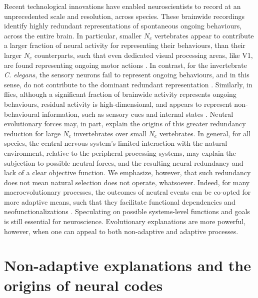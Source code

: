 \documentclass[twocolumn]{article}
\begin{document}
Recent technological innovations have enabled neuroscientists to record at an unprecedented scale and resolution, across species. These brainwide recordings identify highly redundant representations of spontaneous ongoing behaviours, across the entire brain. In particular, smaller $N_e$ vertebrates appear to contribute a larger fraction of neural activity for representing their behaviours, than their larger $N_e$ counterparts, such that even dedicated visual processing areas, like V1, are found representing ongoing motor actions \cite{stringer_harris_2019, kato_2015, aimon_2019, schaffer_2021, kaplan_zimmer_2020}. In contrast, for the invertebrate \textit{C. elegans}, the sensory neurons fail to represent ongoing behaviours, and in this sense, do not contribute to the dominant redundant representation \cite{kato_2015, kaplan_zimmer_2020}. Similarly, in flies, although a significant fraction of brainwide activity represents ongoing behaviours, residual activity is high-dimensional, and appears to represent non-behavioural information, such as sensory cues and internal states \cite{aimon_2019, schaffer_2021}. Neutral evolutionary forces may, in part, explain the origins of this greater redundancy reduction for large $N_e$ invertebrates over small $N_e$ vertebrates. In general, for all species, the central nervous system's limited interaction with the natural environment, relative to the peripheral processing systems, may explain the subjection to possible neutral forces, and the resulting neural redundancy and lack of a clear objective function. We emphasize, however, that such redundancy does not mean natural selection does not operate, whatsoever. Indeed, for many macroevolutionary processes, the outcomes of neutral events can be co-opted for more adaptive means, such that they facilitate functional dependencies and neofunctionalizations \cite{Lynch_2007, bruckner_2021, kebschull_luo_2020}. Speculating on possible systems-level functions and goals is still essential for neuroscience. Evolutionary explanations are more powerful, however, when one can appeal to both non-adaptive and adaptive processes. 

\section{Non-adaptive explanations and the origins of neural codes}
\end{document}
